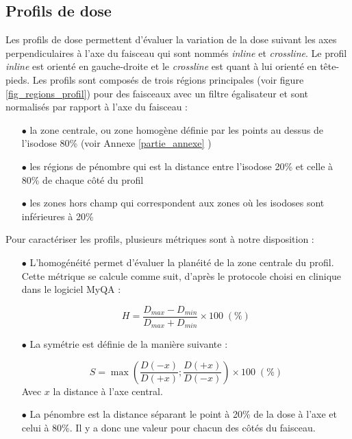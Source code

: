 \documentclass{book}
\begin{document}
\subsection{Profils de dose}

Les profils de dose permettent d'évaluer la variation de la dose suivant les axes perpendiculaires à l'axe du faisceau qui sont nommés \textit{inline} et \textit{crossline}. Le profil \textit{inline} est orienté en gauche-droite et le \textit{crossline} est quant à lui orienté en tête-pieds. Les profils sont composés de trois régions principales (voir figure \ref*{fig_regions_profil}) pour des faisceaux avec un filtre égalisateur et sont normalisés par rapport à l'axe du faisceau :

\begin{itemize}
  \item[$\bullet$] la zone centrale, ou zone homogène définie par les points au dessus de l'isodose 80\% (voir Annexe \ref{partie_annexe} \cite{ansm2007})
  \item[$\bullet$] les régions de pénombre qui est la distance entre l'isodose 20\% et celle à 80\% de chaque côté du profil
  \item[$\bullet$] les zones hors champ qui correspondent aux zones où les isodoses sont inférieures à 20\%
\end{itemize}

Pour caractériser les profils, plusieurs métriques sont à notre disposition :

\begin{itemize}
  \item[$\bullet$] L'homogénéité permet d'évaluer la planéité de la zone centrale du profil. Cette métrique se calcule comme suit, d'après le protocole choisi en clinique dans le logiciel MyQA :
  
  \begin{equation}
    H = \dfrac{D_{max} - D_{min}}{D_{max} + D_{min}} \times 100 \; (\%)
    \label{eq_homogeneite}
  \end{equation}
  
  \item[$\bullet$] La symétrie est définie de la manière suivante :
  
  \begin{equation}
    S = \max\left(\dfrac{D(-x)}{D(+x)}; \dfrac{D(+x)}{D(-x)}\right) \times 100 \; (\%)
    \label{eq_symetrie}
  \end{equation}
  Avec $x$ la distance à l'axe central.
  
  \item[$\bullet$] La pénombre est la distance séparant le point à 20\% de la dose à l'axe et celui à 80\%. Il y a donc une valeur pour chacun des côtés du faisceau.  
\end{itemize}
\end{document}
